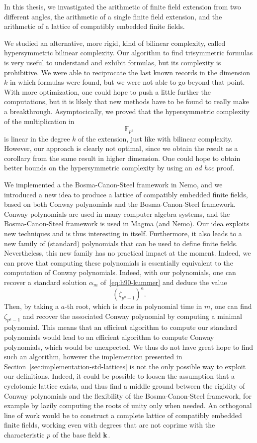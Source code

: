 In this thesis, we invastigated the arithmetic of finite field extension from
two different angles, the arithmetic of a single finite field extension, and the
arithmetic of a lattice of compatibly embedded finite fields.

We studied an alternative, more rigid, kind of bilinear complexity, called
hypersymmetric bilinear complexity. Our algorithm to find trisymmetric formulas
is very useful to understand and exhibit formulas, but its
complexity is prohibitive. We were able to reciprocate the last known records in
the dimension $k$ in which formulas were found, but we were not able to go
beyond that point. With more optimization, one could hope to push a
little further the computations, but it is likely that new methods have to be
found to really make a breakthrough. Asymptocically, we proved that the
hypersymmetric complexity of the multiplication in
\[
  \mathbb{F}_{p^{k}}
\]
is linear in the degree $k$ of the extension, just like with bilinear
complexity. However, our approach is clearly not optimal, since we obtain the
result as a corollary from the same result in higher dimension. One could hope
to obtain better bounds on the hypersymmetric complexity by using an
\emph{ad hoc} proof.

We implemented a the Bosma-Canon-Steel framework in Nemo, and we introduced a
new idea to produce a lattice of
compatibly embedded finite fields, based on both Conway polynomials and the
Bosma-Canon-Steel framework. Conway polynomials are used in many computer
algebra systems, and the Bosma-Canon-Steel framework is used in Magma (and Nemo).
Our idea exploits new techniques and is thus
interesting in itself. Furthermore, it also leads to a new family of (standard)
polynomials that can be used to define finite fields. Nevertheless, this new
family has no practical impact at the moment. Indeed, we can prove that
computing these polynomials is essentially equivalent to the computation of
Conway polynomials. Indeed, with our polynomials, one can recover a standard
solution $\alpha_m$ of~\eqref{eq:h90-kummer} and deduce the value
\[
  (\zeta_{p^a-1})^a.
\]
Then, by taking a $a$-th root, which is done in polynomial time in $m$, one can
find $\zeta_{p^a-1}$ and recover the associated Conway polynomial by computing a
minimal polynomial. This means that an efficient algorithm to compute our
standard polynomials would lead to an efficient algorithm to compute Conway
polynomials, which would be unexpected. We thus do not have great hope to find
such an algorithm, however the implemention presented in
Section~\ref{sec:implementation-std-lattices} is not the only possible way to
exploit our definitions. Indeed, it could be possible to loosen the assumption
that a cyclotomic lattice exists, and thus find a middle ground between the
rigidity of Conway polynomials and the flexibility of the Bosma-Canon-Steel
framework, for example by lazily computing the roots of unity only when needed.
An orthogonal line of work would be to construct a complete lattice of
compatibly embedded finite fields, \ie working even with degrees that are not
coprime with the characteristic $p$ of the base field $\mathbf{k}$.
